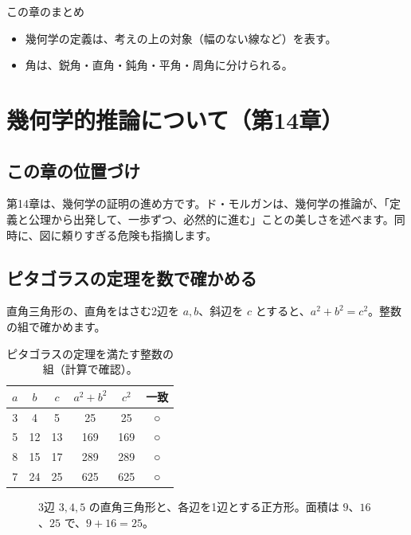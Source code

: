 \documentclass[a4paper,11pt,openany]{ltjsbook}
\begin{document}
\begin{pointbox}{この章のまとめ}
\begin{itemize}[leftmargin=*]
\item 幾何学の定義は、考えの上の対象（幅のない線など）を表す。
\item 角は、鋭角・直角・鈍角・平角・周角に分けられる。
\end{itemize}
\end{pointbox}

\chapter{幾何学的推論について（第14章）}

\section{この章の位置づけ}

第14章は、幾何学の証明の進め方です。ド・モルガンは、幾何学の推論が、「定義と公理から出発して、一歩ずつ、必然的に進む」ことの美しさを述べます。同時に、図に頼りすぎる危険も指摘します。

\section{ピタゴラスの定理を数で確かめる}

直角三角形の、直角をはさむ2辺を $a,b$、斜辺を $c$ とすると、$a^2+b^2=c^2$。整数の組で確かめます。

\begin{table}[htbp]
\centering
\begin{tabular}{ccc|ccc}
\toprule
$a$ & $b$ & $c$ & $a^2+b^2$ & $c^2$ & 一致\\
\midrule
3 & 4 & 5 & 25 & 25 & ○\\
5 & 12 & 13 & 169 & 169 & ○\\
8 & 15 & 17 & 289 & 289 & ○\\
7 & 24 & 25 & 625 & 625 & ○\\
\bottomrule
\end{tabular}
\caption{ピタゴラスの定理を満たす整数の組（計算で確認）。}
\end{table}

\begin{figure}[htbp]
\centering
{}
\caption{3辺 $3,4,5$ の直角三角形と、各辺を1辺とする正方形。面積は $9$、$16$、$25$ で、$9+16=25$。}
\end{figure}
\end{document}
